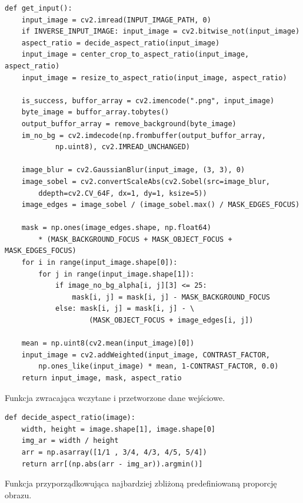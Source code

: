         \begin{code}[H]
        \begin{verbatim}
def get_input(): 
    input_image = cv2.imread(INPUT_IMAGE_PATH, 0)
    if INVERSE_INPUT_IMAGE: input_image = cv2.bitwise_not(input_image)
    aspect_ratio = decide_aspect_ratio(input_image)
    input_image = center_crop_to_aspect_ratio(input_image, aspect_ratio)
    input_image = resize_to_aspect_ratio(input_image, aspect_ratio)

    is_success, buffor_array = cv2.imencode(".png", input_image)
    byte_image = buffor_array.tobytes()
    output_buffor_array = remove_background(byte_image)
    im_no_bg = cv2.imdecode(np.frombuffer(output_buffor_array, 
            np.uint8), cv2.IMREAD_UNCHANGED)

    image_blur = cv2.GaussianBlur(input_image, (3, 3), 0)
    image_sobel = cv2.convertScaleAbs(cv2.Sobel(src=image_blur,
        ddepth=cv2.CV_64F, dx=1, dy=1, ksize=5))
    image_edges = image_sobel / (image_sobel.max() / MASK_EDGES_FOCUS)

    mask = np.ones(image_edges.shape, np.float64)
        * (MASK_BACKGROUND_FOCUS + MASK_OBJECT_FOCUS + MASK_EDGES_FOCUS)
    for i in range(input_image.shape[0]):
        for j in range(input_image.shape[1]):
            if image_no_bg_alpha[i, j][3] <= 25:
                mask[i, j] = mask[i, j] - MASK_BACKGROUND_FOCUS
            else: mask[i, j] = mask[i, j] - \
                    (MASK_OBJECT_FOCUS + image_edges[i, j])

    mean = np.uint8(cv2.mean(input_image)[0]) 
    input_image = cv2.addWeighted(input_image, CONTRAST_FACTOR, 
        np.ones_like(input_image) * mean, 1-CONTRAST_FACTOR, 0.0)
    return input_image, mask, aspect_ratio 
        \end{verbatim}
        \caption{Funkcja zwracająca wczytane i przetworzone dane wejściowe.}
        \label{imp-art-input-code}
        \end{code}
        
        \begin{code}[H]
        \begin{verbatim}
def decide_aspect_ratio(image):
    width, height = image.shape[1], image.shape[0]
    img_ar = width / height
    arr = np.asarray([1/1 , 3/4, 4/3, 4/5, 5/4])
    return arr[(np.abs(arr - img_ar)).argmin()]
        \end{verbatim}
        \caption{Funkcja przyporządkowująca najbardziej zbliżoną  predefiniowaną proporcję obrazu.}
        \label{imp-art-input-ar-code}
        \end{code}
        

